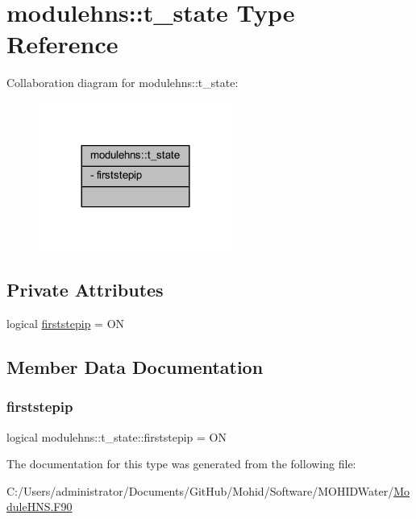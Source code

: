 \hypertarget{structmodulehns_1_1t__state}{}\section{modulehns\+:\+:t\+\_\+state Type Reference}
\label{structmodulehns_1_1t__state}


Collaboration diagram for modulehns\+:\+:t\+\_\+state\+:\nopagebreak
\begin{figure}[H]
\begin{center}
\leavevmode
\includegraphics[width=180pt]{structmodulehns_1_1t__state__coll__graph}
\end{center}
\end{figure}
\subsection*{Private Attributes}
\begin{DoxyCompactItemize}
\item 
logical \mbox{\hyperlink{structmodulehns_1_1t__state_ad0557989da8847975ea13a900559dc96}{firststepip}} = ON
\end{DoxyCompactItemize}


\subsection{Member Data Documentation}
\mbox{\label{structmodulehns_1_1t__state_ad0557989da8847975ea13a900559dc96}} 
\subsubsection{\texorpdfstring{firststepip}{firststepip}}
{\footnotesize\ttfamily logical modulehns\+::t\+\_\+state\+::firststepip = ON\hspace{0.3cm}{\ttfamily [private]}}



The documentation for this type was generated from the following file\+:\begin{DoxyCompactItemize}
\item 
C\+:/\+Users/administrator/\+Documents/\+Git\+Hub/\+Mohid/\+Software/\+M\+O\+H\+I\+D\+Water/\mbox{\hyperlink{_module_h_n_s_8_f90}{Module\+H\+N\+S.\+F90}}\end{DoxyCompactItemize}
